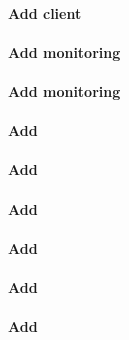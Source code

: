 \documentclass[letterpaper]{article}
\begin{document}
\vspace*{0.4cm}
\paragraph{Add \Lustre{} client} \label{sec:lustre_client}

\vspace*{0.2cm}



\paragraph{Add \Nagios{} monitoring}


\paragraph{Add \Ganglia{} monitoring}


\clearpage
\paragraph{Add \clustershell{}}


\paragraph{Add \mrsh{}}


\paragraph{Add \genders{}}


\paragraph{Add \conman{}} \label{sec:add_conman}


\paragraph{Add \nhc{}} \label{sec:add_nhc}


\paragraph{Add \GEOPM{}} \label{sec:add_geopm}

\end{document}
